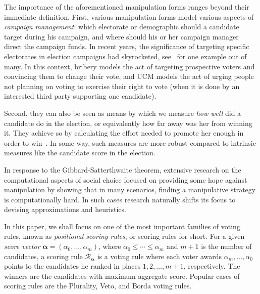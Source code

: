 \documentclass[letterpaper]{article} %
\theoremstyle{definition}
\newcommand\vecgreek{\bm}
\newcommand{\veca}{\vecgreek{\alpha}}
\newcommand{\Ra}{\mathcal{R}_{\veca}}
\begin{document}
The importance of the aforementioned manipulation forms ranges beyond their immediate definition. First, various manipulation forms model various aspects of \emph{campaign management}:  which electorate or demographic should a candidate target during his campaign, and where should his or her campaign manager direct the campaign funds. In recent years, the significance of targeting specific electorates in election campaigns had skyrocketed,
see~\cite{hillary} for one example out of many. In this context, bribery models the act of targeting prospective voters and convincing them to change their vote, and UCM models the act of urging people not planning on voting to exercise their right to vote (when it is done by an interested third party supporting one candidate).  


Second, they can also be seen as means by which we measure \emph{how well} did a candidate do in the election, or equivalently how far away was her from winning it. They achieve so by calculating the effort needed to promote her enough in order to win~\cite{DBLP:conf/atal/FaliszewskiST17}. In some way, such measures are more robust compared to intrinsic measures like the candidate score in the election. 

In response to the Gibbard-Satterthwaite theorem, extensive research on the computational aspects of social choice focused on providing some hope against manipulation
by showing that in many scenarios, finding a manipulative strategy is computationally hard. In such cases research naturally shifts its focus to  devising  approximations and heuristics.

In this paper, we shall focus on one of the most important families of voting rules, known as \emph{positional scoring rules}, or scoring rules for short. For a given \emph{score vector} $\veca= (\alpha_{0},\ldots,\alpha_m)$, where $\alpha_{0}\leq \cdots \leq \alpha_m$ and $m+1$ is the number of candidates, a scoring rule $\Ra$ is a voting rule where each voter awards $\alpha_m,\ldots,\alpha_{0}$ points to the candidates he ranked in places $1,2,\ldots,m+1$, respectively. 
The winners are the candidates with maximum aggregate score. 
Popular cases of scoring rules are the Plurality, Veto, and Borda voting rules.
\end{document}
